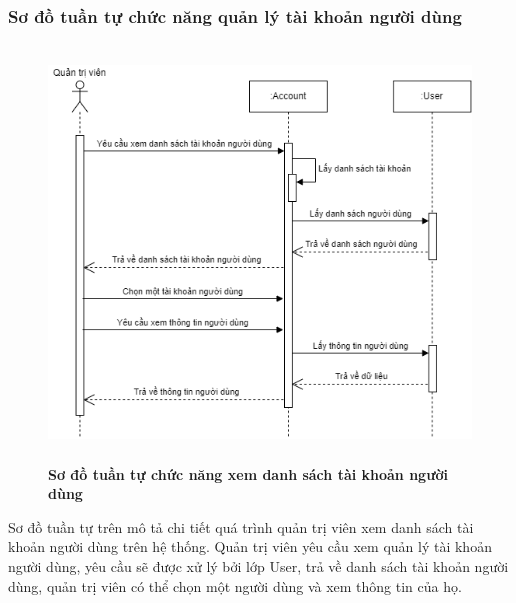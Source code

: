 \subsubsection{Sơ đồ tuần tự chức năng quản lý tài khoản người dùng}
\begin{figure}[H]
  \centering
  \includegraphics[width=13cm,height=11cm]{Images/sequence/sequence_manage_user.png}
  \caption[Sơ đồ tuần tự chức năng xem danh sách tài khoản người dùng]{\bfseries \fontsize{12pt}{0pt}
  \selectfont Sơ đồ tuần tự chức năng xem danh sách tài khoản người dùng}
  \label{sequence_manage_user} %
\end{figure}
Sơ đồ tuần tự trên mô tả chi tiết quá trình quản trị viên xem danh sách tài khoản người dùng trên hệ thống. Quản trị viên yêu cầu xem
quản lý tài khoản người dùng, yêu cầu sẽ được xử lý bởi lớp User, trả về danh sách tài khoản người dùng, quản trị viên có thể chọn một người dùng và xem thông tin của họ. 
